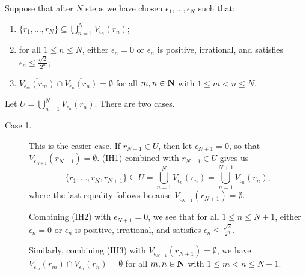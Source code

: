 \documentclass{lew98_solutions}
\begin{document}
\begin{solution}
\begin{enumerate}
        Suppose that after \( N \) steps we have chosen \( \epsilon_1, \ldots, \epsilon_N \) such that:
        \begin{enumerate}[leftmargin=40pt, label=(IH\arabic*)]
            \item \( \{ r_1, \ldots, r_N \} \subseteq \bigcup_{n=1}^{N} V_{\epsilon_n}(r_n) \);

            \item for all \( 1 \leq n \leq N \), either \( \epsilon_n = 0 \) or \( \epsilon_n \) is positive, irrational, and satisfies \( \epsilon_n \leq \tfrac{\sqrt{2}}{2^n} \);

            \item \( \overline{V_{\epsilon_m}(r_m)} \cap \overline{V_{\epsilon_n}(r_n)} = \emptyset \) for all \( m, n \in \mathbf{N} \) with \( 1 \leq m < n \leq N \).
        \end{enumerate}
        
        Let \( U = \bigcup_{n=1}^N V_{\epsilon_n}(r_n) \). There are two cases.
        \begin{description}
            \item[Case 1.] This is the easier case. If \( r_{N+1} \in U \), then let \( \epsilon_{N+1} = 0 \), so that \( V_{\epsilon_{N+1}}(r_{N+1}) = \emptyset \). (IH1) combined with \( r_{N+1} \in U \) gives us
            \[
                \{ r_1, \ldots, r_N, r_{N+1} \} \subseteq U = \bigcup_{n=1}^N V_{\epsilon_n}(r_n) = \bigcup_{n=1}^{N+1} V_{\epsilon_n}(r_n),
            \]
            where the last equality follows because \( V_{\epsilon_{N+1}}(r_{N+1}) = \emptyset \).
            
            Combining (IH2) with \( \epsilon_{N+1} = 0 \), we see that for all \( 1 \leq n \leq N + 1 \), either \( \epsilon_n = 0 \) or \( \epsilon_n \) is positive, irrational, and satisfies \( \epsilon_n \leq \tfrac{\sqrt{2}}{2^n} \).

            Similarly, combining (IH3) with \( V_{\epsilon_{N+1}}(r_{N+1}) = \emptyset \), we have \( \overline{V_{\epsilon_m}(r_m)} \cap \overline{V_{\epsilon_n}(r_n)} = \emptyset \) for all \( m, n \in \mathbf{N} \) with \( 1 \leq m < n \leq N + 1 \).


\end{description}
\end{enumerate}
\end{solution}
\end{document}
